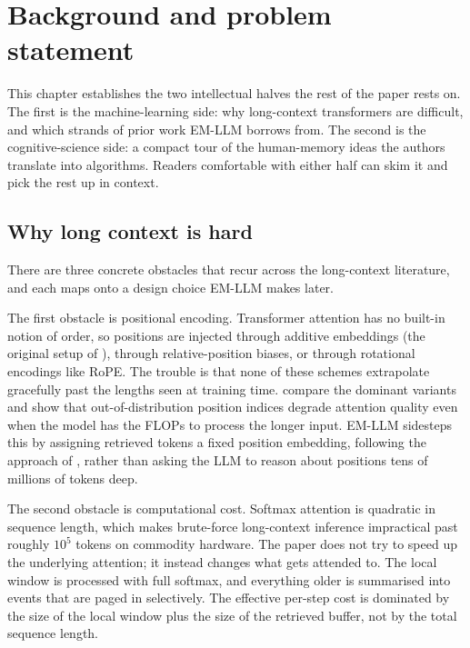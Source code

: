 \section{Background and problem statement}
\label{sec:background}

This chapter establishes the two intellectual halves the rest of the paper rests on. The first is the machine-learning side: why long-context transformers are difficult, and which strands of prior work EM-LLM borrows from. The second is the cognitive-science side: a compact tour of the human-memory ideas the authors translate into algorithms. Readers comfortable with either half can skim it and pick the rest up in context.

\subsection{Why long context is hard}
\label{sec:why-long-context}

There are three concrete obstacles that recur across the long-context literature, and each maps onto a design choice EM-LLM makes later.

The first obstacle is positional encoding. Transformer attention has no built-in notion of order, so positions are injected through additive embeddings (the original setup of \textcite{vaswani2017attention}), through relative-position biases, or through rotational encodings like RoPE. The trouble is that none of these schemes extrapolate gracefully past the lengths seen at training time. \textcite{kazemnejad2024impact} compare the dominant variants and show that out-of-distribution position indices degrade attention quality even when the model has the FLOPs to process the longer input. EM-LLM sidesteps this by assigning retrieved tokens a fixed position embedding, following the approach of \textcite{xiao2024infllm}, rather than asking the LLM to reason about positions tens of millions of tokens deep.

The second obstacle is computational cost. Softmax attention is quadratic in sequence length, which makes brute-force long-context inference impractical past roughly $10^5$ tokens on commodity hardware. The paper does not try to speed up the underlying attention; it instead changes what gets attended to. The local window is processed with full softmax, and everything older is summarised into events that are paged in selectively. The effective per-step cost is dominated by the size of the local window plus the size of the retrieved buffer, not by the total sequence length.

